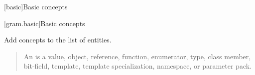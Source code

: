[basic]{Basic concepts}

[gram.basic]{Basic concepts}

Add concepts to the list of entities.

\setcounter{Paras}{2}
\begin{quote}
An  is a value, object, reference, function, enumerator, type,
class member, bit-field, template,  template specialization, 
namespace, or parameter pack.
\end{quote}
